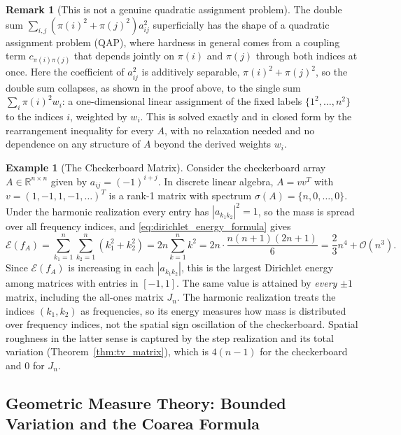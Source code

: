 \documentclass[11pt,a4paper,reqno]{amsart}
\theoremstyle{definition}
\newtheorem{example}[theorem]{Example}
\newtheorem{remark}[theorem]{Remark}
\numberwithin{equation}{section}
\newcommand{\R}{\mathbb{R}}
\begin{document}
\begin{remark}[This is not a genuine quadratic assignment problem]
\label{rem:not_qap}
The double sum $\sum_{i,j}(\pi(i)^2+\pi(j)^2)a_{ij}^2$ superficially has the shape of a quadratic assignment problem (QAP), where hardness in general comes from a coupling term $c_{\pi(i)\pi(j)}$ that depends jointly on $\pi(i)$ and $\pi(j)$ through both indices at once. Here the coefficient of $a_{ij}^2$ is additively separable, $\pi(i)^2+\pi(j)^2$, so the double sum collapses, as shown in the proof above, to the single sum $\sum_i \pi(i)^2 w_i$: a one-dimensional linear assignment of the fixed labels $\{1^2,\dots,n^2\}$ to the indices $i$, weighted by $w_i$. This is solved exactly and in closed form by the rearrangement inequality for every $A$, with no relaxation needed and no dependence on any structure of $A$ beyond the derived weights $w_i$.
\end{remark}

\begin{example}[The Checkerboard Matrix]
Consider the checkerboard array $A \in \R^{n \times n}$ given by $a_{ij} = (-1)^{i+j}$. In discrete linear algebra, $A = v v^T$ with $v = (1, -1, 1, -1, \dots)^T$ is a rank-1 matrix with spectrum $\sigma(A) = \{n, 0, \dots, 0\}$. Under the harmonic realization every entry has $|a_{k_1 k_2}|^2 = 1$, so the mass is spread over all frequency indices, and \eqref{eq:dirichlet_energy_formula} gives
\begin{equation}
    \mathcal{E}(f_A) = \sum_{k_1=1}^n \sum_{k_2=1}^n (k_1^2 + k_2^2) = 2n \sum_{k=1}^n k^2 = 2n \cdot \frac{n(n+1)(2n+1)}{6} = \frac{2}{3} n^4 + \mathcal{O}(n^3).
\end{equation}
Since $\mathcal{E}(f_A)$ is increasing in each $|a_{k_1 k_2}|$, this is the largest Dirichlet energy among matrices with entries in $[-1,1]$. The same value is attained by \emph{every} $\pm 1$ matrix, including the all-ones matrix $J_n$. The harmonic realization treats the indices $(k_1,k_2)$ as frequencies, so its energy measures how mass is distributed over frequency indices, not the spatial sign oscillation of the checkerboard. Spatial roughness in the latter sense is captured by the step realization and its total variation (Theorem~\ref{thm:tv_matrix}), which is $4(n-1)$ for the checkerboard and $0$ for $J_n$.
\end{example}

\subsection{Geometric Measure Theory: Bounded Variation and the Coarea Formula}
\label{subsec:coarea}
\end{document}
